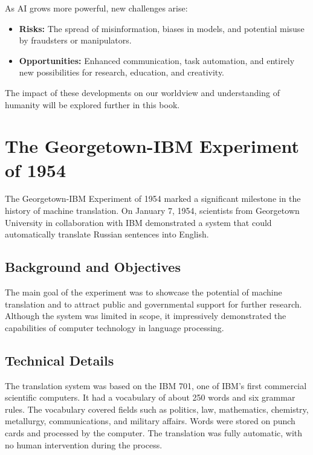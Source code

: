 As AI grows more powerful, new challenges arise:
\begin{itemize}
  \item \textbf{Risks:} The spread of misinformation, biases in models, and potential
        misuse by fraudsters or manipulators.
  \item \textbf{Opportunities:} Enhanced communication, task automation, and entirely
        new possibilities for research, education, and creativity.
\end{itemize}

The impact of these developments on our worldview and understanding of humanity will
be explored further in this book.


\section{The Georgetown-IBM Experiment of 1954}

The Georgetown-IBM Experiment of 1954 marked a significant milestone in the history of
machine translation. On January 7, 1954, scientists from Georgetown University in
collaboration with IBM demonstrated a system that could automatically translate Russian
sentences into English.

\subsection{Background and Objectives}

The main goal of the experiment was to showcase the potential of machine translation and
to attract public and governmental support for further research. Although the system was
limited in scope, it impressively demonstrated the capabilities of computer technology
in language processing.

\subsection{Technical Details}

The translation system was based on the IBM 701, one of IBM’s first commercial scientific
computers. It had a vocabulary of about 250 words and six grammar rules. The vocabulary
covered fields such as politics, law, mathematics, chemistry, metallurgy, communications,
and military affairs. Words were stored on punch cards and processed by the computer.
The translation was fully automatic, with no human intervention during the process.

